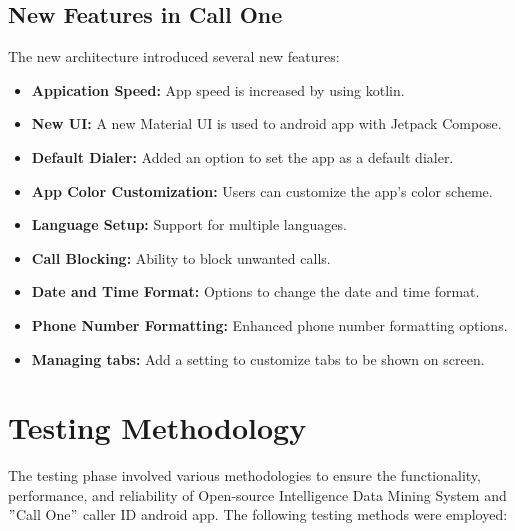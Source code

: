 \subsection{New Features in Call One}\label{subsec:new-features}
The new architecture introduced several new features:
\begin{itemize}
    \item \textbf{Appication Speed:} App speed is increased by using kotlin.
    \item \textbf{New UI:} A new Material UI is used to android app with Jetpack Compose.
    \item \textbf{Default Dialer: } Added an option to set the app as a default dialer.
    \item \textbf{App Color Customization:} Users can customize the app's color scheme.
    \item \textbf{Language Setup:} Support for multiple languages.
    \item \textbf{Call Blocking:} Ability to block unwanted calls.
    \item \textbf{Date and Time Format:} Options to change the date and time format.
    \item \textbf{Phone Number Formatting:} Enhanced phone number formatting options.
    \item \textbf{Managing tabs:} Add a setting to customize tabs to be shown on screen.
\end{itemize}


\section{Testing Methodology}\label{sec:testing-methodology}

The testing phase involved various methodologies to ensure the functionality, performance, and reliability of Open-source Intelligence Data Mining System and  \("\)Call One\("\) caller ID  android app.
The following testing methods were employed:

